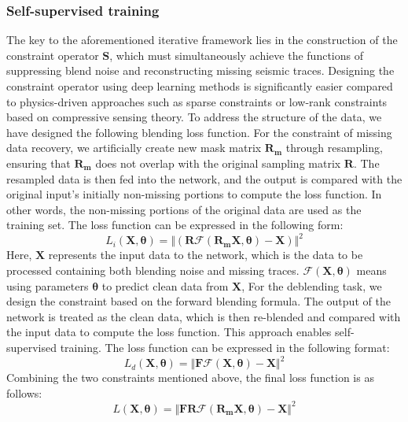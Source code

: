 \documentclass{segabs}
\begin{document}
\subsubsection{Self-supervised training}
The key to the aforementioned iterative framework lies in the construction of the constraint operator $\mathbf{S}$, which must simultaneously achieve the functions of suppressing blend noise and reconstructing missing seismic traces. Designing the constraint operator using deep learning methods is significantly easier compared to physics-driven approaches such as sparse constraints or low-rank constraints based on compressive sensing theory. To address the structure of the data, we have designed the following blending loss function.
For the constraint of missing data recovery, we artificially create new mask matrix $\mathbf{R_m}$ through resampling, ensuring that 
$\mathbf{R_m}$ does not overlap with the original sampling matrix $\mathbf{R}$. The resampled data is then fed into the network, and the output is compared with the original input's initially non-missing portions to compute the loss function. In other words, the non-missing portions of the original data are used as the training set. The loss function can be expressed in the following form:
\begin{equation}
\text{}{L}_{i}(\mathbf{X},\mathbf{\theta})= \Vert (\mathbf{R}\mathcal{F}(\mathbf{R_m} \mathbf{X},\mathbf{\theta}) - \mathbf{X})\Vert^{2}
\end{equation}
Here, $\mathbf{X}$ represents the input data to the network, which is the data to be processed containing both blending noise and missing traces. $\mathcal{F}(\mathbf{X},\mathbf{\theta})$ means using parameters $\mathbf{\theta}$ to predict clean data from $\mathbf{X}$, For the deblending task, we design the constraint based on the forward blending formula. The output of the network is treated as the clean data, which is then re-blended and compared with the input data to compute the loss function. This approach enables self-supervised training. The loss function can be expressed in the following format:
\begin{equation}
\text{}{L}_{d}(\mathbf{X},\mathbf{\theta})= \Vert \mathbf{F} \mathcal{F}(\mathbf{X},\mathbf{\theta}) - \mathbf{X}\Vert^{2}
\end{equation}
Combining the two constraints mentioned above, the final loss function is as follows:
\begin{equation}\label{lossf}
\text{}{L}(\mathbf{X},\mathbf{\theta})= \Vert \mathbf{F}\mathbf{R}\mathcal{F}(\mathbf{R_m}\mathbf{X},\mathbf{\theta}) - \mathbf{X}\Vert^{2}
\end{equation}
\end{document}
